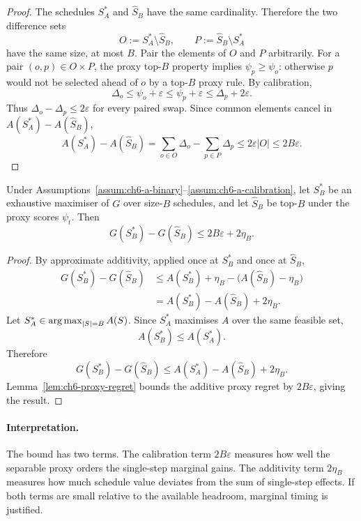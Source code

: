 \begin{proof}
The schedules $S_A^*$ and $\widehat S_B$ have the same cardinality. Therefore
the two difference sets
\[
  O := S_A^*\setminus \widehat S_B,
  \qquad
  P := \widehat S_B\setminus S_A^*
\]
have the same size, at most $B$. Pair the elements of $O$ and $P$ arbitrarily.
For a pair $(o,p)\in O\times P$, the proxy top-$B$ property implies
$\psi_p\ge \psi_o$: otherwise $p$ would not be selected ahead of $o$ by a
top-$B$ proxy rule. By calibration,
\[
  \Delta_o \le \psi_o+\varepsilon
            \le \psi_p+\varepsilon
            \le \Delta_p+2\varepsilon .
\]
Thus $\Delta_o-\Delta_p\le 2\varepsilon$ for every paired swap. Since common
elements cancel in $A(S_A^*)-A(\widehat S_B)$,
\[
  A(S_A^*)-A(\widehat S_B)
    = \sum_{o\in O}\Delta_o-\sum_{p\in P}\Delta_p
    \le 2\varepsilon |O|
    \le 2B\varepsilon .
\]
\end{proof}

\begin{theorem}
\label{thm:ch6-a}
Under Assumptions~\ref{assum:ch6-a-binary}--\ref{assum:ch6-a-calibration},
let $S_B^*$ be an exhaustive maximiser of $G$ over size-$B$ schedules, and let
$\widehat S_B$ be top-$B$ under the proxy scores $\psi_t$. Then
\[
  G(S_B^*)-G(\widehat S_B)
  \le 2B\varepsilon + 2\eta_B .
\]
\end{theorem}

\begin{proof}
By approximate additivity, applied once at $S_B^*$ and once at
$\widehat S_B$,
\[
\begin{aligned}
  G(S_B^*)-G(\widehat S_B)
  &\le A(S_B^*)+\eta_B - \bigl(A(\widehat S_B)-\eta_B\bigr)\\
  &= A(S_B^*)-A(\widehat S_B)+2\eta_B .
\end{aligned}
\]
Let $S_A^*\in\operatorname*{arg\,max}_{|S|=B}A(S)$. Since $S_A^*$ maximises $A$ over the same
feasible set,
\[
  A(S_B^*)\le A(S_A^*).
\]
Therefore
\[
  G(S_B^*)-G(\widehat S_B)
  \le A(S_A^*)-A(\widehat S_B)+2\eta_B .
\]
Lemma~\ref{lem:ch6-proxy-regret} bounds the additive proxy regret by
$2B\varepsilon$, giving the result.
\end{proof}

\paragraph{Interpretation.}
The bound has two terms. The calibration term $2B\varepsilon$ measures how
well the separable proxy orders the single-step marginal gains. The additivity
term $2\eta_B$ measures how much schedule value deviates from the sum of
single-step effects. If both terms are small relative to the available
headroom, marginal timing is justified.


